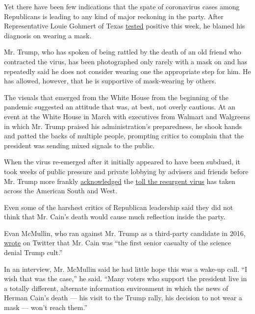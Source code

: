 Yet there have been few indications that the spate of coronavirus cases
among Republicans is leading to any kind of major reckoning in the
party. After Representative Louie Gohmert of Texas
\href{https://www.nytimes3xbfgragh.onion/2020/07/29/us/politics/louie-gohmert-positive-coronavirus-mask.html}{tested}
positive this week, he blamed his diagnosis on wearing a mask.

Mr. Trump, who has spoken of being rattled by the death of an old friend
who contracted the virus, has been photographed only rarely with a mask
on and has repeatedly said he does not consider wearing one the
appropriate step for him. He has allowed, however, that he is supportive
of mask-wearing by others.

The visuals that emerged from the White House from the beginning of the
pandemic suggested an attitude that was, at best, not overly cautious.
At an event at the White House in March with executives from Walmart and
Walgreens in which Mr. Trump praised his administration's preparedness,
he shook hands and patted the backs of multiple people, prompting
critics to complain that the president was sending mixed signals to the
public.

When the virus re-emerged after it initially appeared to have been
subdued, it took weeks of public pressure and private lobbying by
advisers and friends before Mr. Trump more frankly
\href{https://www.nytimes3xbfgragh.onion/2020/07/20/us/politics/trump-coronavirus-briefings.html}{acknowledged}
the
\href{https://www.nytimes3xbfgragh.onion/interactive/2020/us/coronavirus-us-cases.html}{toll
the resurgent virus} has taken across the American South and West.

Even some of the harshest critics of Republican leadership said they did
not think that Mr. Cain's death would cause much reflection inside the
party.

Evan McMullin, who ran against Mr. Trump as a third-party candidate in
2016,
\href{https://twitter.com/EvanMcMullin/status/1288849392754143234?ref_src=twsrc\%5Etfw\%7Ctwcamp\%5Etweetembed\%7Ctwterm\%5E1288849392754143234\%7Ctwgr\%5E\&ref_url=https\%3A\%2F\%2Fwww.breitbart.com\%2F2020-election\%2F2020\%2F07\%2F30\%2Fnever-trumps-evan-mcmullin-blames-trump-cult-for-herman-cain-death\%2F}{wrote}
on Twitter that Mr. Cain was ``the first senior casualty of the science
denial Trump cult.''

In an interview, Mr. McMullin said he had little hope this was a wake-up
call. ``I wish that was the case,'' he said. ``Many voters who support
the president live in a totally different, alternate information
environment in which the news of Herman Cain's death --- his visit to
the Trump rally, his decision to not wear a mask --- won't reach them.''


